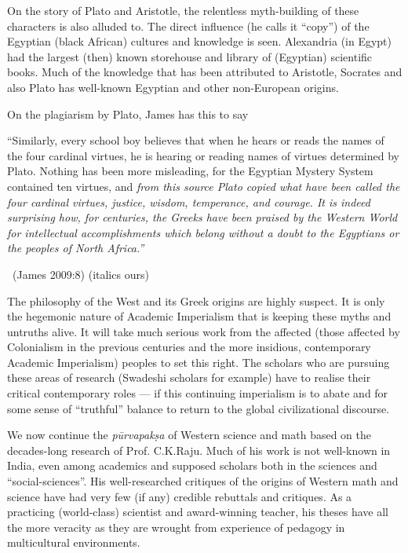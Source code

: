 On the story of Plato and Aristotle, the relentless myth-building of these characters is also alluded to. The direct influence (he calls it “copy”) of the Egyptian (black African) cultures and knowledge is seen. Alexandria (in Egypt) had the largest (then) known storehouse and library of (Egyptian) scientific books. Much of the knowledge that has been attributed to Aristotle, Socrates and also Plato has well-known Egyptian and other non-European origins.

On the plagiarism by Plato, James has this to say

\begin{myquote}
“Similarly, every school boy believes that when he hears or reads the names of the four cardinal virtues, he is hearing or reading names of virtues determined by Plato. Nothing has been more misleading, for the Egyptian Mystery System contained ten virtues, and \textit{from this source Plato copied what have been called the four cardinal virtues, justice, wisdom, temperance, and courage. It is indeed surprising how, for centuries, the Greeks have been praised by the Western World for intellectual accomplishments which belong without a doubt to the Egyptians or the peoples of North Africa.”} 

~\hfill (James 2009:8) (italics ours)
\end{myquote}

The philosophy of the West and its Greek origins are highly suspect. It is only the hegemonic nature of Academic Imperialism that is keeping these myths and untruths alive. It will take much serious work from the affected (those affected by Colonialism in the previous centuries and the more insidious, contemporary Academic Imperialism) peoples to set this right. The scholars who are pursuing these areas of research (Swadeshi scholars for example) have to realise their critical contemporary roles — if this continuing imperialism is to abate and for some sense of “truthful” balance to return to the global civilizational discourse.

\vskip 3pt

We now continue the \textit{pūrvapakṣa} of Western science and math based on the decades-long research of Prof. C.K.Raju. Much of his work is not well-known in India, even among academics and supposed scholars both in the sciences and “social-sciences”. His well-researched critiques of the origins of Western math and science have had very few (if any) credible rebuttals and critiques. As a practicing (world-class) scientist and award-winning teacher, his theses have all the more veracity as they are wrought from experience of pedagogy in multicultural environments.

